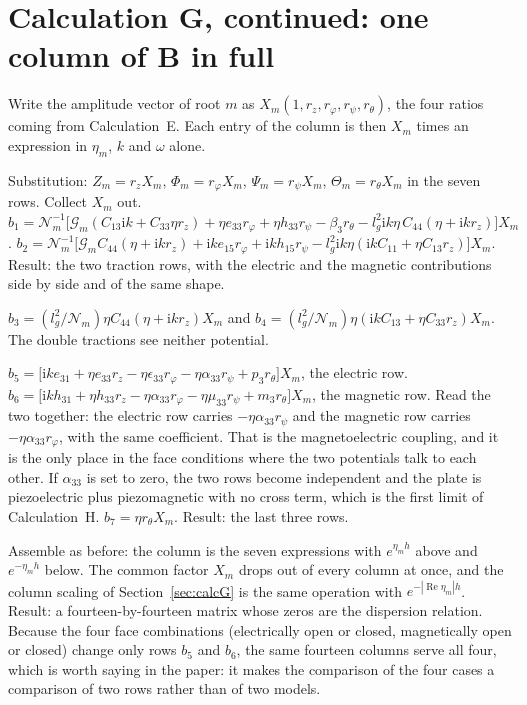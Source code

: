 \documentclass[11pt]{article}
\makeatletter
\newif\ifshowworked
\newenvironment{worked}{%
  \ifshowworked\par\smallskip\noindent\textit{Working.}\par\smallskip\else
  \setbox\z@\vbox\bgroup\fi}{\ifshowworked\par\smallskip\else\egroup\fi}
\newcommand{\ii}{\mathrm{i}}
\newcommand{\Ncal}{\mathcal{N}}
\newcommand{\Gcal}{\mathcal{G}}
\makeatother
\begin{document}
\section{Calculation G, continued: one column of $\mathbf B$ in full}

Write the amplitude vector of root $m$ as $X_m(1,r_z,r_\varphi,r_\psi,r_\theta)$, the four ratios coming
from Calculation~E. Each entry of the column is then $X_m$ times an expression in $\eta_m$, $k$ and
$\omega$ alone.

\begin{worked}
Substitution: $Z_m=r_zX_m$, $\Phi_m=r_\varphi X_m$, $\Psi_m=r_\psi X_m$, $\Theta_m=r_\theta X_m$ in the
seven rows. Collect $X_m$ out.
$b_1=\Ncal_m^{-1}\bigl[\Gcal_m(C_{13}\ii k+C_{33}\eta r_z)+\eta e_{33}r_\varphi+\eta h_{33}r_\psi
-\beta_3r_\theta-l_g^2\ii k\eta\,C_{44}(\eta+\ii kr_z)\bigr]X_m$.
$b_2=\Ncal_m^{-1}\bigl[\Gcal_mC_{44}(\eta+\ii kr_z)+\ii ke_{15}r_\varphi+\ii kh_{15}r_\psi
-l_g^2\ii k\eta(\ii kC_{11}+\eta C_{13}r_z)\bigr]X_m$.
Result: the two traction rows, with the electric and the magnetic contributions side by side and of the
same shape.
\end{worked}

\begin{worked}
$b_3=(l_g^2/\Ncal_m)\eta C_{44}(\eta+\ii kr_z)X_m$ and
$b_4=(l_g^2/\Ncal_m)\eta(\ii kC_{13}+\eta C_{33}r_z)X_m$. The double tractions see neither potential.
\end{worked}

\begin{worked}
$b_5=\bigl[\ii ke_{31}+\eta e_{33}r_z-\eta\epsilon_{33}r_\varphi-\eta\alpha_{33}r_\psi
+p_3r_\theta\bigr]X_m$, the electric row.
$b_6=\bigl[\ii kh_{31}+\eta h_{33}r_z-\eta\alpha_{33}r_\varphi-\eta\mu_{33}r_\psi+m_3r_\theta\bigr]X_m$,
the magnetic row. Read the two together: the electric row carries $-\eta\alpha_{33}r_\psi$ and the magnetic
row carries $-\eta\alpha_{33}r_\varphi$, with the same coefficient. That is the magnetoelectric coupling,
and it is the only place in the face conditions where the two potentials talk to each other. If
$\alpha_{33}$ is set to zero, the two rows become independent and the plate is piezoelectric plus
piezomagnetic with no cross term, which is the first limit of Calculation~H.
$b_7=\eta r_\theta X_m$. Result: the last three rows.
\end{worked}

\begin{worked}
Assemble as before: the column is the seven expressions with $e^{\eta_mh}$ above and $e^{-\eta_mh}$ below.
The common factor $X_m$ drops out of every column at once, and the column scaling of
Section~\ref{sec:calcG} is the same operation with $e^{-|\operatorname{Re}\eta_m|h}$. Result: a
fourteen-by-fourteen matrix whose zeros are the dispersion relation. Because the four face combinations
(electrically open or closed, magnetically open or closed) change only rows $b_5$ and $b_6$, the same
fourteen columns serve all four, which is worth saying in the paper: it makes the comparison of the four
cases a comparison of two rows rather than of two models.
\end{worked}
\end{document}
